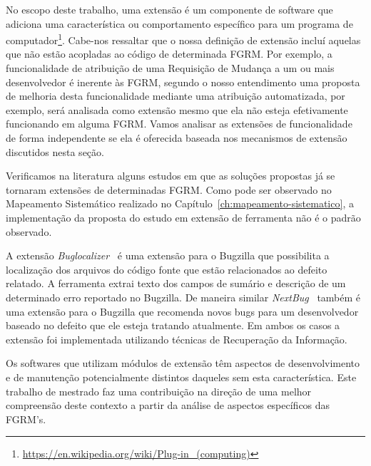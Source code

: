 No escopo deste trabalho, uma extensão é um componente de software que adiciona
uma característica ou comportamento específico para um programa de
computador\footnote{\url{https://en.wikipedia.org/wiki/Plug-in_(computing)}}.
Cabe-nos ressaltar que o nossa definição de extensão incluí aquelas que não
estão acopladas ao código de determinada FGRM\@. Por exemplo, a funcionalidade
de atribuição de uma Requisição de Mudança a um ou mais desenvolvedor é inerente
às FGRM, segundo o nosso entendimento uma proposta de melhoria desta
funcionalidade mediante uma atribuição automatizada, por exemplo, será analisada
como extensão mesmo que ela não esteja efetivamente funcionando em alguma
FGRM\@. Vamos a\-na\-li\-sar as extensões de funcionalidade de forma
independente se ela é oferecida baseada nos mecanismos de extensão discutidos
nesta seção.

Verificamos na literatura alguns estudos em que as soluções propostas já se
tornaram extensões de determinadas FGRM. Como pode ser observado no Mapeamento
Sistemático realizado no Capítulo~\ref{ch:mapeamento-sistematico}, a
implementação da proposta do estudo em extensão de ferramenta não é o padrão
observado.

A extensão \textit{Buglocalizer}~\cite{Thung:2014:BIT:2635868.2661678} é uma
extensão para o Bugzilla que possibilita a localização dos arquivos do código
fonte que estão relacionados ao defeito relatado. A ferramenta extrai texto dos
campos de sumário e descrição de um determinado erro reportado no Bugzilla. De
maneira similar \textit{NextBug}~\cite{101186} também é uma extensão para o
Bugzilla que recomenda novos bugs para um desenvolvedor baseado no defeito que
ele esteja tratando atualmente. Em ambos os casos a extensão foi implementada
utilizando técnicas de Recuperação da Informação.

Os softwares que utilizam módulos de extensão têm aspectos de desenvolvimento e
de manutenção potencialmente distintos daqueles sem esta característica. Este
trabalho de mestrado faz uma contribuição na direção de uma melhor compreensão
deste contexto a partir da análise de aspectos específicos das FGRM's.
